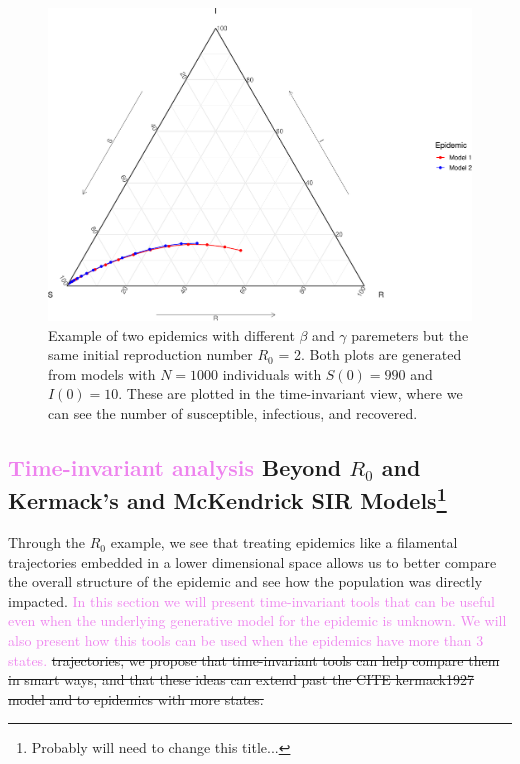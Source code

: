 \documentclass[
  shortnames]{jss}
\begin{document}
\begin{CodeChunk}
\begin{figure}[H]

{\centering \includegraphics{Figs/unnamed-chunk-3-1} 

}

\caption{\label{fig:different-scales-tern}Example of two epidemics with different $\beta$ and $\gamma$ paremeters but the same initial reproduction number $R_0$ = 2.  Both plots are generated from models with $N= 1000$ individuals with $S(0) = 990$ and $I(0) = 10$.  These are plotted in the time-invariant view, where we can see the number of susceptible, infectious, and recovered.}\label{fig:unnamed-chunk-3}
\end{figure}
\end{CodeChunk}

\subsection[Beyond R0 and SIR]{\textcolor{violet}{Time-invariant analysis}
Beyond \(R_0\) and Kermack's and McKendrick SIR
Models\footnote{Probably will need to change this title...}}\label{beyond-r0-sir}

Through the \(R_0\) example, we see that treating epidemics like a
filamental trajectories embedded in a lower dimensional space allows us
to better compare the overall structure of the epidemic and see how the
population was directly impacted.
\textcolor{violet}{In this section we will present time-invariant tools that can be useful even when the underlying generative model for the epidemic is unknown. We will also present how this tools can be used when the epidemics have more than 3 states.}
\sout{trajectories, we propose that time-invariant tools can help compare them in smart ways, and that these ideas can extend past the CITE kermack1927 model and to epidemics with more states. }
\end{document}
